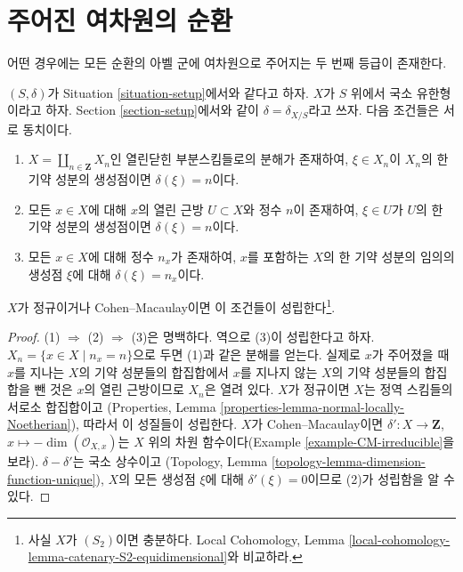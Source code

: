 \section{주어진 여차원의 순환}
\label{section-cycles-codimension}

\noindent
어떤 경우에는 모든 순환의 아벨 군에 여차원으로 주어지는 두 번째
등급이 존재한다.

\begin{lemma}
\label{lemma-locally-equidimensional}
$(S, \delta)$가 Situation \ref{situation-setup}에서와 같다고 하자.
$X$가 $S$ 위에서 국소 유한형이라고 하자. Section
\ref{section-setup}에서와 같이 $\delta = \delta_{X/S}$라고 쓰자.
다음 조건들은 서로 동치이다.
\begin{enumerate}
\item $X = \coprod_{n \in \mathbf{Z}} X_n$인 열린닫힌 부분스킴들로의
분해가 존재하여, $\xi \in X_n$이 $X_n$의 한 기약 성분의 생성점이면
$\delta(\xi) = n$이다.
\item 모든 $x \in X$에 대해 $x$의 열린 근방 $U \subset X$와 정수
$n$이 존재하여, $\xi \in U$가 $U$의 한 기약 성분의 생성점이면
$\delta(\xi) = n$이다.
\item 모든 $x \in X$에 대해 정수 $n_x$가 존재하여, $x$를 포함하는
$X$의 한 기약 성분의 임의의 생성점 $\xi$에 대해
$\delta(\xi) = n_x$이다.
\end{enumerate}
$X$가 정규이거나 Cohen--Macaulay이면 이 조건들이
성립한다\footnote{사실 $X$가 $(S_2)$이면 충분하다. Local Cohomology,
Lemma \ref{local-cohomology-lemma-catenary-S2-equidimensional}와 비교하라.}.
\end{lemma}

\begin{proof}
(1) $\Rightarrow$ (2) $\Rightarrow$ (3)은 명백하다. 역으로 (3)이
성립한다고 하자. $X_n = \{x \in X \mid n_x = n\}$으로 두면 (1)과 같은
분해를 얻는다. 실제로 $x$가 주어졌을 때 $x$를 지나는 $X$의 기약
성분들의 합집합에서 $x$를 지나지 않는 $X$의 기약 성분들의 합집합을
뺀 것은 $x$의 열린 근방이므로 $X_n$은 열려 있다. $X$가 정규이면
$X$는 정역 스킴들의 서로소 합집합이고
(Properties, Lemma \ref{properties-lemma-normal-locally-Noetherian}),
따라서 이 성질들이 성립한다.
$X$가 Cohen--Macaulay이면
$\delta' : X \to \mathbf{Z}$, $x \mapsto -\dim(\mathcal{O}_{X, x})$는
$X$ 위의 차원 함수이다(Example \ref{example-CM-irreducible}을 보라).
$\delta - \delta'$는 국소 상수이고
(Topology, Lemma \ref{topology-lemma-dimension-function-unique}),
$X$의 모든 생성점 $\xi$에 대해 $\delta'(\xi) = 0$이므로 (2)가
성립함을 알 수 있다.
\end{proof}

